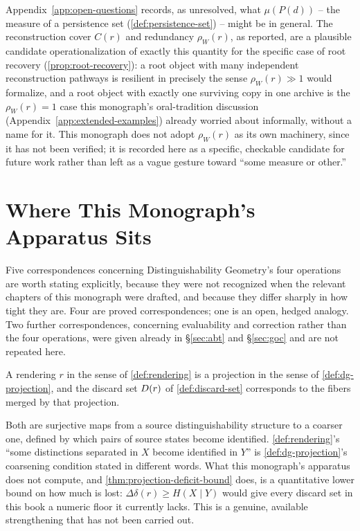 \begin{remark}
\label{rem:witnesses-persistence-measure}
Appendix~\ref{app:open-questions} records, as unresolved, what
$\mu(P(d))$ -- the measure of a persistence set (\cref{def:persistence-set})
-- might be in general. The reconstruction cover $C(r)$ and redundancy
$\rho_W(r)$, as reported, are a plausible candidate operationalization of
exactly this quantity for the specific case of root recovery
(\cref{prop:root-recovery}): a root object with many independent
reconstruction pathways is resilient in precisely the sense
$\rho_W(r) \gg 1$ would formalize, and a root object with exactly one
surviving copy in one archive is the $\rho_W(r) = 1$ case this monograph's
oral-tradition discussion (Appendix~\ref{app:extended-examples}) already
worried about informally, without a name for it. This monograph does not
adopt $\rho_W(r)$ as its own machinery, since it has not been verified;
it is recorded here as a specific, checkable candidate for future work
rather than left as a vague gesture toward ``some measure or other.''
\end{remark}

\section{Where This Monograph's Apparatus Sits}
\label{sec:where-this-sits}


Five correspondences concerning Distinguishability Geometry's four
operations are worth stating explicitly, because they were not
recognized when the relevant chapters of this monograph were drafted, and
because they differ sharply in how tight they are. Four are proved
correspondences; one is an open, hedged analogy. Two further
correspondences, concerning evaluability and correction rather than the
four operations, were given already in \S\ref{sec:abt} and \S\ref{sec:goc}
and are not repeated here.

\begin{proposition}
\label{prop:rendering-is-projection}
A rendering $r$ in the sense of \cref{def:rendering} is a projection in the
sense of \cref{def:dg-projection}, and the discard set $D(r)$ of
\cref{def:discard-set} corresponds to the fibers merged by that projection.
\end{proposition}

\begin{proofsketch}
Both are surjective maps from a source distinguishability structure to a
coarser one, defined by which pairs of source states become identified.
\cref{def:rendering}'s ``some distinctions separated in $X$ become identified
in $Y$'' is \cref{def:dg-projection}'s coarsening condition stated in
different words. What this monograph's apparatus does not compute, and
\cref{thm:projection-deficit-bound} does, is a quantitative lower bound on
how much is lost: $\Delta\delta(r) \ge H(X \mid Y)$ would give every discard
set in this book a numeric floor it currently lacks. This is a genuine,
available strengthening that has not been carried out.
\end{proofsketch}

